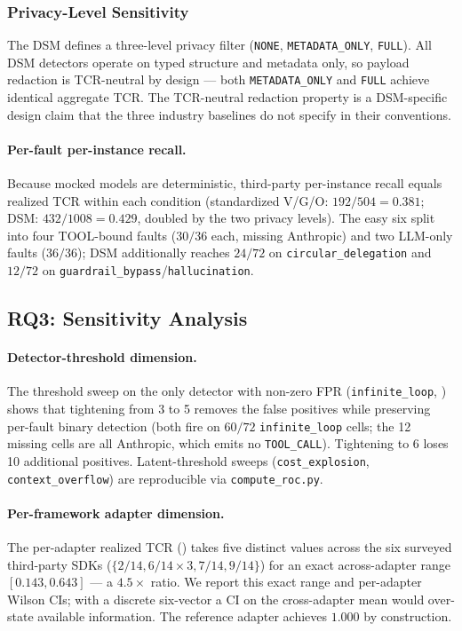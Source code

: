 \documentclass[a4paper,UKenglish,cleveref,autoref,thm-restate]{lipics-v2021}
\begin{document}
\subsubsection*{Privacy-Level Sensitivity}
\label{sec:rq2-privacy}

The DSM defines a three-level privacy filter
(\texttt{NONE}, \texttt{METADATA\_ONLY}, \texttt{FULL}). All DSM
detectors operate on typed structure and metadata only, so payload
redaction is TCR-neutral by design --- both \texttt{METADATA\_ONLY}
and \texttt{FULL} achieve identical aggregate TCR. The TCR-neutral
redaction property is a DSM-specific design claim that the three
industry baselines do not specify in their conventions.

\paragraph*{Per-fault per-instance recall.}
\label{sec:per-instance-recall}
Because mocked models are deterministic, third-party per-instance
recall equals realized TCR within each condition (standardized
V/G/O: $192/504=0.381$; DSM: $432/1008=0.429$, doubled by the two
privacy levels). The easy six split into four TOOL-bound faults
($30/36$ each, missing Anthropic) and two LLM-only faults ($36/36$);
DSM additionally reaches $24/72$ on \texttt{circular\_delegation}
and $12/72$ on \texttt{guardrail\_bypass}/\texttt{hallucination}.

\subsection{RQ3: Sensitivity Analysis}
\label{sec:rq3}

\paragraph*{Detector-threshold dimension.}
The threshold sweep on the only detector with non-zero FPR
(\texttt{infinite\_loop}, ) shows that tightening from
3 to 5 removes the false positives while preserving per-fault binary
detection (both fire on $60/72$ \texttt{infinite\_loop} cells; the
12 missing cells are all Anthropic, which emits no
\texttt{TOOL\_CALL}). Tightening to 6 loses 10 additional positives.
Latent-threshold sweeps (\texttt{cost\_explosion},
\texttt{context\_overflow}) are reproducible via
\texttt{compute\_roc.py}.

\paragraph*{Per-framework adapter dimension.}
The per-adapter realized TCR () takes five
distinct values across the six surveyed third-party SDKs ($\{2/14,
6/14 \times 3, 7/14, 9/14\}$) for an exact across-adapter range
$[0.143, 0.643]$ --- a $4.5\times$ ratio. We report this exact
range and per-adapter Wilson CIs; with a discrete six-vector a CI on
the cross-adapter mean would over-state available information. The
reference adapter achieves $1.000$ by construction.
\end{document}
